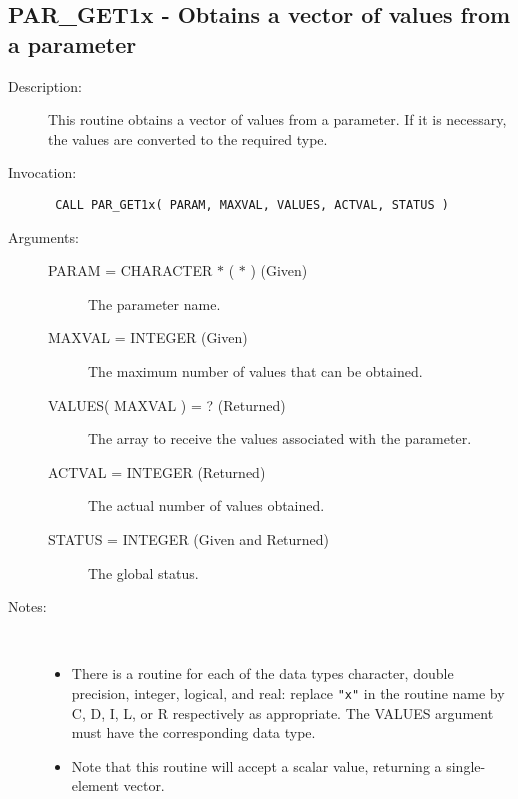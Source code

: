 \documentclass[twoside,11pt]{article}
\newcommand{\xlabel}[1]{}
\newlength{\sstbannerlength}
\newlength{\sstcaptionlength}
\newlength{\sstexampleslength}
\newlength{\sstexampleswidth}
\newcommand{\sstroutine}[3]{
   \goodbreak
   \rule{\textwidth}{0.5mm}
   \vspace{-7ex}
   \newline
   \settowidth{\sstbannerlength}{{\Large {\bf #1}}}
   \setlength{\sstcaptionlength}{\textwidth}
   \setlength{\sstexampleslength}{\textwidth}
   \addtolength{\sstbannerlength}{0.5em}
   \addtolength{\sstcaptionlength}{-2.0\sstbannerlength}
   \addtolength{\sstcaptionlength}{-5.0pt}
   \settowidth{\sstexampleswidth}{{\bf Examples:}}
   \addtolength{\sstexampleslength}{-\sstexampleswidth}
   \parbox[t]{\sstbannerlength}{\flushleft{\Large {\bf #1}}}
   \parbox[t]{\sstcaptionlength}{\center{\Large #2}}
   \parbox[t]{\sstbannerlength}{\flushright{\Large {\bf #1}}}
   \begin{description}
      #3
   \end{description}
}
\newcommand{\sstdescription}[1]{\item[Description:] #1}
\newcommand{\sstinvocation}[1]{\item[Invocation:]\hspace{0.4em}{\tt #1}}
\newcommand{\sstarguments}[1]{
   \item[Arguments:] \mbox{} \\
   \vspace{-3.5ex}
   \begin{description}
      #1
   \end{description}
}
\newcommand{\sstsubsection}[1]{ \item[{#1}] \mbox{} \\}
\newcommand{\sstnotes}[1]{\item[Notes:] \mbox{} \\[1.3ex] #1}
\newcommand{\sstitemlist}[1]{
  \mbox{} \\
  \vspace{-7ex}
  \begin{itemize}
     #1
  \end{itemize}
}
\newcommand{\sstitem}{\item}
\newcommand{\ssttt}{\tt}
\renewcommand{\sstroutine}[3]{
      \subsection{\xlabel{12}#1\xlabel{#1}-\label{#1}#2}
      \begin{description}
         #3
      \end{description}
   }
\renewcommand{\sstdescription}[1]{\item[Description:]
      \begin{description}
         #1
      \end{description}
   }
\renewcommand{\sstinvocation}[1]{\item[Invocation:]
      \begin{description}
         {\ssttt #1}
      \end{description}
   }
\renewcommand{\sstarguments}[1]{
      \item[Arguments:]
      \begin{description}
         #1
      \end{description}
   }
\renewcommand{\sstsubsection}[1]{\item[{#1}]}
\renewcommand{\sstnotes}[1]{\item[Notes:]
      \begin{description}
         #1
      \end{description}
   }
\newcommand{\sstitemlist}[1]{
      \begin{itemize}
         #1
      \end{itemize}
   }
\begin{document}
\sstroutine{
   PAR\_GET1x
}{
   Obtains a vector of values from a parameter
}{
   \sstdescription{
      This routine obtains a vector of values from a parameter. If it is
      necessary, the values are converted to the required type.
   }
   \sstinvocation{
      CALL PAR\_GET1x( PARAM, MAXVAL, VALUES, ACTVAL, STATUS )
   }
   \sstarguments{
      \sstsubsection{
         PARAM = CHARACTER $*$ ( $*$ ) (Given)
      }{
         The parameter name.
      }
      \sstsubsection{
         MAXVAL = INTEGER (Given)
      }{
         The maximum number of values that can be obtained.
      }
      \sstsubsection{
         VALUES( MAXVAL ) = ? (Returned)
      }{
         The array to receive the values associated with the parameter.
      }
      \sstsubsection{
         ACTVAL = INTEGER (Returned)
      }{
         The actual number of values obtained.
      }
      \sstsubsection{
         STATUS = INTEGER (Given and Returned)
      }{
         The global status.
      }
   }
   \sstnotes{
      \sstitemlist{

         \sstitem
         There is a routine for each of the data types character,
         double precision, integer, logical, and real: replace {\tt "x"} in the
         routine name by C, D, I, L, or R respectively as appropriate.  The
         VALUES argument must have the corresponding data type.

         \sstitem
         Note that this routine will accept a scalar value, returning
         a single-element vector.
      }
   }
}
\end{document}
